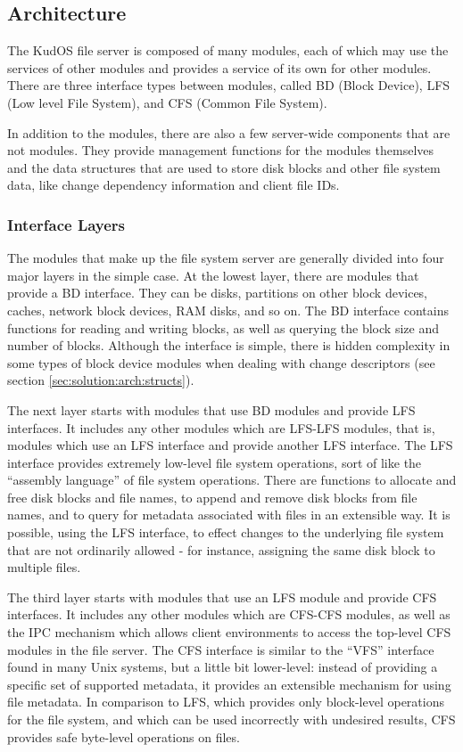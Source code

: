 \subsection{Architecture}
\label{sec:solution:arch}

The KudOS file server is composed of many modules, each of which may use the
services of other modules and provides a service of its own for other modules.
There are three interface types between modules, called BD (Block Device), LFS
(Low level File System), and CFS (Common File System).

In addition to the modules, there are also a few server-wide components that are
not modules. They provide management functions for the modules themselves and
the data structures that are used to store disk blocks and other file system
data, like change dependency information and client file IDs.

\subsubsection{Interface Layers}
\label{sec:solution:arch:layers}

The modules that make up the file system server are generally divided into four
major layers in the simple case. At the lowest layer, there are modules that
provide a BD interface. They can be disks, partitions on other block devices,
caches, network block devices, RAM disks, and so on. The BD interface contains
functions for reading and writing blocks, as well as querying the block size and
number of blocks. Although the interface is simple, there is hidden complexity
in some types of block device modules when dealing with change descriptors (see
section \ref{sec:solution:arch:structs}).

The next layer starts with modules that use BD modules and provide LFS
interfaces. It includes any other modules which are LFS-LFS modules, that is,
modules which use an LFS interface and provide another LFS interface. The LFS
interface provides extremely low-level file system operations, sort of like the
``assembly language'' of file system operations. There are functions to allocate
and free disk blocks and file names, to append and remove disk blocks from file
names, and to query for metadata associated with files in an extensible way. It
is possible, using the LFS interface, to effect changes to the underlying
file system that are not ordinarily allowed - for instance, assigning the same
disk block to multiple files.

The third layer starts with modules that use an LFS module and provide CFS
interfaces. It includes any other modules which are CFS-CFS modules, as well as
the IPC mechanism which allows client environments to access the top-level CFS
modules in the file server. The CFS interface is similar to the ``VFS''
interface found in many Unix systems, but a little bit lower-level: instead of
providing a specific set of supported metadata, it provides an extensible
mechanism for using file metadata. In comparison to LFS, which provides only
block-level operations for the file system, and which can be used incorrectly
with undesired results, CFS provides safe byte-level operations on files.

